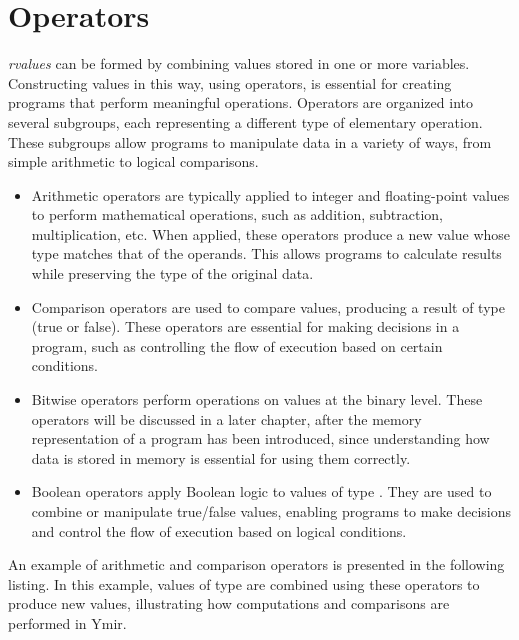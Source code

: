 \vfill\pagebreak%
\section{Operators}

\textit{rvalues} can be formed by combining values stored in one or more
variables. Constructing values in this way, using operators, is essential for
creating programs that perform meaningful operations. Operators are organized
into several subgroups, each representing a different type of elementary
operation. These subgroups allow programs to manipulate data in a variety of
ways, from simple arithmetic to logical comparisons.

\vspace{-5pt}%
\begin{itemize}
  \setlength\itemsep{-4pt}
\item Arithmetic operators are typically applied to integer and floating-point
  values to perform mathematical operations, such as addition, subtraction,
  multiplication, etc. When applied, these operators produce a new value whose
  type matches that of the operands. This allows programs to calculate results
  while preserving the type of the original data.
\smallskip{}

\item Comparison operators are used to compare values,
  producing a result of type  (true or false). These operators are
  essential for making decisions in a program, such as controlling the flow of
  execution based on certain conditions.
\smallskip{}

\item Bitwise operators perform operations on values at the binary level. These
  operators will be discussed in a later chapter, after the memory
  representation of a program has been introduced, since understanding how data
  is stored in memory is essential for using them correctly.
\smallskip{}

\item Boolean operators apply Boolean logic to values of type . They
  are used to combine or manipulate true/false values, enabling programs to make
  decisions and control the flow of execution based on logical conditions.
  \smallskip{}

\end{itemize}

An example of arithmetic and comparison operators is presented in the following
listing. In this example, values of type  are combined using these
operators to produce new values, illustrating how computations and comparisons
are performed in Ymir.

